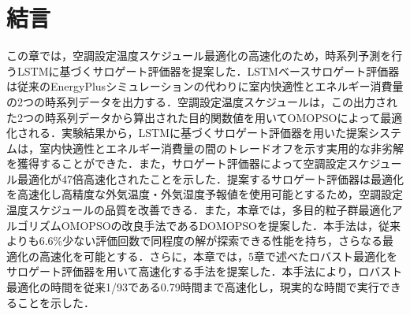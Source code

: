 \section{結言}
この章では，空調設定温度スケジュール最適化の高速化のため，時系列予測を行うLSTMに基づくサロゲート評価器を提案した．LSTMベースサロゲート評価器は従来のEnergyPlusシミュレーションの代わりに室内快適性とエネルギー消費量の2つの時系列データを出力する．空調設定温度スケジュールは，この出力された2つの時系列データから算出された目的関数値を用いてOMOPSOによって最適化される．実験結果から，LSTMに基づくサロゲート評価器を用いた提案システムは，室内快適性とエネルギー消費量の間のトレードオフを示す実用的な非劣解を獲得することができた．また，サロゲート評価器によって空調設定スケジュール最適化が47倍高速化されたことを示した．提案するサロゲート評価器は最適化を高速化し高精度な外気温度・外気湿度予報値を使用可能とするため，空調設定温度スケジュールの品質を改善できる．また，本章では，多目的粒子群最適化アルゴリズムOMOPSOの改良手法であるDOMOPSOを提案した．本手法は，従来よりも6.6\%少ない評価回数で同程度の解が探索できる性能を持ち，さらなる最適化の高速化を可能とする．さらに，本章では，5章で述べたロバスト最適化をサロゲート評価器を用いて高速化する手法を提案した．本手法により，ロバスト最適化の時間を従来1/93である0.79時間まで高速化し，現実的な時間で実行できることを示した．
